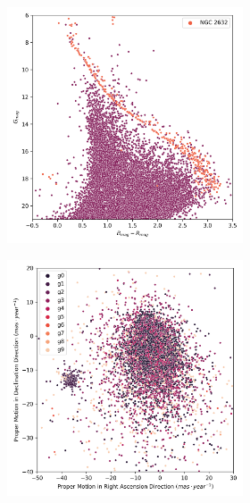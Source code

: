 \documentclass[11pt, a4paper, english]{book}
\begin{document}
\begin{figure}[H]
\begin{subfigure}{0.9\textwidth}
\begin{subfigure}[t]{0.30\textwidth}
    \end{subfigure}
    \hfill
    \begin{subfigure}[t]{0.30\textwidth}
      \centering
      \includegraphics[width=\textwidth]{../figures/ngc_2632/hr_diagram_ngc_2632.png}
    \end{subfigure}
  \end{subfigure}
  \caption{NGC 2632 Clusterix+TOPCAT characterization.}
  \centering
  \begin{subfigure}{0.9\textwidth}
    \centering
    \begin{subfigure}[t]{0.30\textwidth}
      \centering
      \includegraphics[width=\textwidth]{../figures/ngc_2632/kmeans_pm_ngc_2632.png}

\end{subfigure}
\end{subfigure}
\end{figure}
\end{document}
